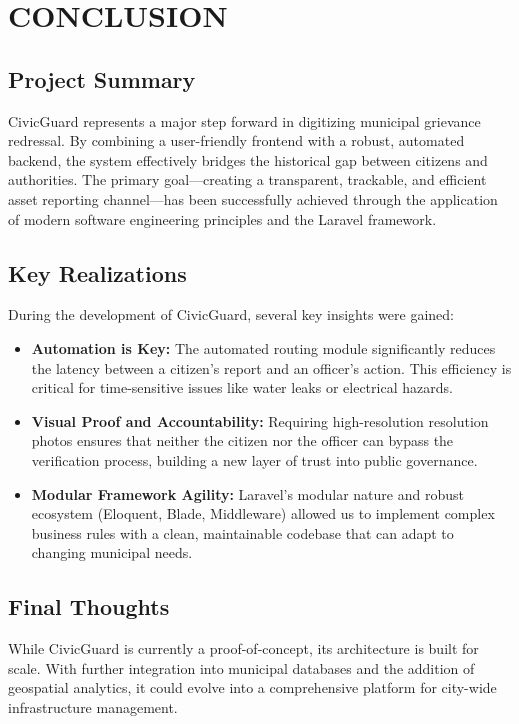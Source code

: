 \chapter{CONCLUSION}

\section{Project Summary}
CivicGuard represents a major step forward in digitizing municipal grievance redressal. By combining a user-friendly frontend with a robust, automated backend, the system effectively bridges the historical gap between citizens and authorities. The primary goal—creating a transparent, trackable, and efficient asset reporting channel—has been successfully achieved through the application of modern software engineering principles and the Laravel framework.

\section{Key Realizations}
During the development of CivicGuard, several key insights were gained:
\begin{itemize}
    \item \textbf{Automation is Key:} The automated routing module significantly reduces the latency between a citizen's report and an officer's action. This efficiency is critical for time-sensitive issues like water leaks or electrical hazards.
    \item \textbf{Visual Proof and Accountability:} Requiring high-resolution resolution photos ensures that neither the citizen nor the officer can bypass the verification process, building a new layer of trust into public governance.
    \item \textbf{Modular Framework Agility:} Laravel's modular nature and robust ecosystem (Eloquent, Blade, Middleware) allowed us to implement complex business rules with a clean, maintainable codebase that can adapt to changing municipal needs.
\end{itemize}

\section{Final Thoughts}
While CivicGuard is currently a proof-of-concept, its architecture is built for scale. With further integration into municipal databases and the addition of geospatial analytics, it could evolve into a comprehensive platform for city-wide infrastructure management.
